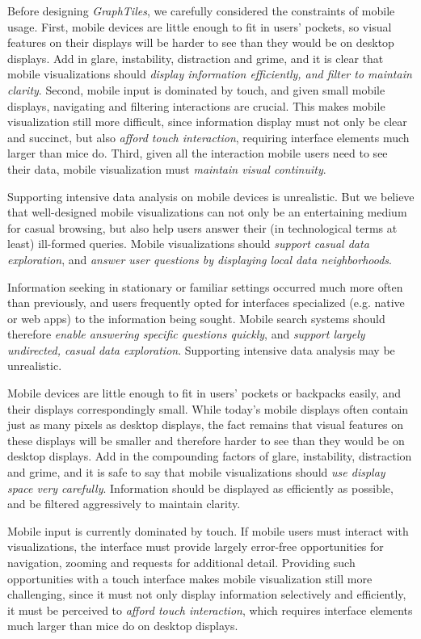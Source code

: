 

Before designing \textit{GraphTiles}, we carefully considered the constraints of mobile usage. First, mobile devices are little enough to fit in users' pockets, so visual features on their displays will be harder to see than they would be on desktop displays. Add in glare, instability, distraction and grime, and it is clear that mobile visualizations should \textit{display information efficiently, and filter to maintain clarity}. Second, mobile input is dominated by touch, and given small mobile displays, navigating and filtering interactions are crucial. This makes mobile visualization still more difficult, since information display must not only be clear and succinct, but also \textit{afford touch interaction}, requiring interface elements much larger than mice do. Third, given all the interaction mobile users need to see their data, mobile visualization must \textit{maintain visual continuity}.


Supporting intensive data analysis on mobile devices is unrealistic. But we believe that well-designed mobile visualizations can not only be an entertaining medium for casual browsing, but also help users answer their (in technological terms at least) ill-formed queries. Mobile visualizations should \textit{support casual data exploration}, and \textit{answer user questions by displaying local data neighborhoods}.


Information seeking in stationary or familiar settings occurred much more often than previously, and users frequently opted for interfaces specialized (e.g. native or web apps) to the information being sought. Mobile search systems should therefore \textit{enable answering specific questions quickly}, and \textit{support largely undirected, casual data exploration}. Supporting intensive data analysis may be unrealistic.


Mobile devices are little enough to fit in users' pockets or backpacks easily, and their displays correspondingly small. While today's mobile displays often contain just as many pixels as desktop displays, the fact remains that visual features on these displays will be smaller and therefore harder to see than they would be on desktop displays. Add in the compounding factors of glare, instability, distraction and grime, and it is safe to say that mobile visualizations should \textit{use display space very carefully}. Information should be displayed as efficiently as possible, and be filtered aggressively to maintain clarity. 

Mobile input is currently dominated by touch. If mobile users must interact with visualizations, the interface must provide largely error-free opportunities for navigation, zooming and requests for additional detail. Providing such opportunities with a touch interface makes mobile visualization still more challenging, since it must not only display information selectively and efficiently, it must be perceived to \textit{afford touch interaction}, which requires interface elements much larger than mice do on desktop displays.

